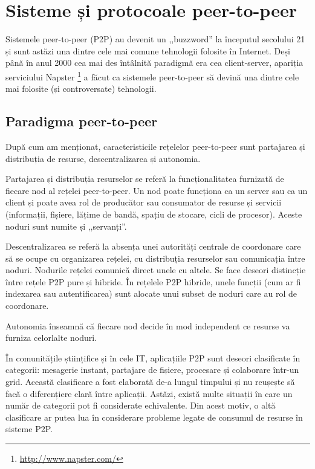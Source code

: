
\chapter{Sisteme și protocoale peer-to-peer}
\label{chapter:p2p-systems}

Sistemele peer-to-peer (P2P) au devenit un ,,buzzword'' la începutul
secolului 21 și sunt astăzi una dintre cele mai comune tehnologii folosite
în Internet. Deși până în anul 2000 cea mai des întâlnită paradigmă
era cea client-server, apariția serviciului Napster
\footnote{\url{http://www.napster.com/}} a făcut ca sistemele peer-to-peer
să devină una dintre cele mai folosite (și controversate) tehnologii.

\section{Paradigma peer-to-peer}
\label{sec:p2p-systems:paragigm}

După cum am menționat, caracteristicile rețelelor peer-to-peer sunt 
partajarea și distribuția de resurse, descentralizarea și autonomia.

Partajarea și distribuția resurselor se referă la funcționalitatea
furnizată de fiecare nod al rețelei peer-to-peer. Un nod poate funcționa
ca un server sau ca un client și poate avea rol de producător sau
consumator de resurse și servicii (informații, fișiere, lățime de bandă,
spațiu de stocare, cicli de procesor). Aceste noduri sunt numite și
,,servanți''.

Descentralizarea se referă la absența unei autorități centrale de coordonare
care să se ocupe cu organizarea rețelei, cu distribuția resurselor sau
comunicația între noduri. Nodurile rețelei comunică direct unele cu altele.
Se face deseori distincție între rețele P2P pure și hibride. În rețelele P2P
hibride, unele funcții (cum ar fi indexarea sau autentificarea) sunt alocate
unui subset de noduri care au rol de coordonare.

Autonomia înseamnă că fiecare nod decide în mod independent ce resurse
va furniza celorlalte noduri.

În comunitățile științifice și în cele IT, aplicațiile P2P sunt deseori
clasificate în categorii: mesagerie instant, partajare de fișiere, procesare
și colaborare într-un grid.  Această clasificare a fost elaborată de-a lungul
timpului și nu reușește să facă o diferențiere clară între aplicații. Astăzi,
există multe situații în care un număr de categorii pot fi considerate
echivalente. Din acest motiv, o altă clasificare ar putea lua în considerare
probleme legate de consumul de resurse în sisteme P2P.

